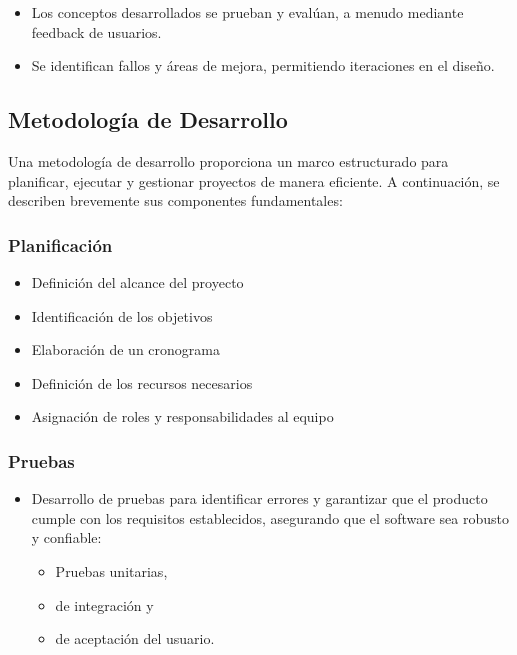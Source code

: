 \documentclass[spanish, 12pt]{article}
\providecommand{\tightlist}{\setlength{\itemsep}{0pt}
\setlength{\parskip}{0pt}}
\begin{document}
	\begin{itemize}
		\tightlist

		\item Los conceptos desarrollados se prueban y evalúan, a menudo mediante
			feedback de usuarios.

		\item Se identifican fallos y áreas de mejora, permitiendo iteraciones en el
			diseño.
	\end{itemize}

	\subsection{Metodología de Desarrollo}
	\label{metodologuxeda-de-desarrollo}

	Una metodología de desarrollo proporciona un marco estructurado para planificar,
	ejecutar y gestionar proyectos de manera eficiente. A continuación, se
	describen brevemente sus componentes fundamentales:

	\subsubsection{Planificación}
	\label{planificaciuxf3n}

	\begin{itemize}
		\tightlist

		\item Definición del alcance del proyecto

		\item Identificación de los objetivos

		\item Elaboración de un cronograma

		\item Definición de los recursos necesarios

		\item Asignación de roles y responsabilidades al equipo
	\end{itemize}

	\subsubsection{Pruebas}
	\label{pruebas}

	\begin{itemize}
		\tightlist

		\item Desarrollo de pruebas para identificar errores y garantizar que el producto
			cumple con los requisitos establecidos, asegurando que el software sea
			robusto y confiable:

			\begin{itemize}
				\tightlist

				\item Pruebas unitarias,

				\item de integración y

				\item de aceptación del usuario.
			\end{itemize}
	\end{itemize}
\end{document}
